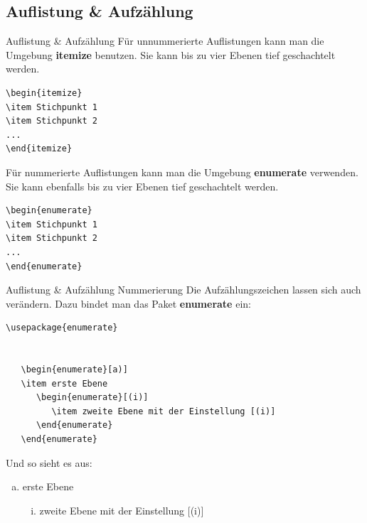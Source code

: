 \subsection{Auflistung \& Aufzählung}
\begin{frame}[fragile]{Auflistung \& Aufzählung}
Für unnummerierte Auflistungen kann man die Umgebung \textbf{itemize} benutzen. Sie kann bis zu vier Ebenen tief geschachtelt werden.
\begin{lstlisting}[style=tex]
\begin{itemize}
\item Stichpunkt 1
\item Stichpunkt 2
...
\end{itemize}
\end{lstlisting}%
Für nummerierte Auflistungen kann man die Umgebung \textbf{enumerate} verwenden. Sie kann ebenfalls bis zu vier Ebenen tief geschachtelt werden.
\begin{lstlisting}[style=tex]
\begin{enumerate}
\item Stichpunkt 1
\item Stichpunkt 2
...
\end{enumerate}
\end{lstlisting}
\end{frame}

\begin{frame}[fragile]{Auflistung \& Aufzählung Nummerierung}
Die Aufzählungszeichen lassen sich auch verändern.
Dazu bindet man das Paket \textbf{enumerate} ein:
\begin{lstlisting}[style=tex]
\usepackage{enumerate}


   \begin{enumerate}[a)]
   \item erste Ebene
      \begin{enumerate}[(i)]
         \item zweite Ebene mit der Einstellung [(i)]
      \end{enumerate}
   \end{enumerate}

\end{lstlisting}%

\bigskip
Und so sieht es aus:
\begin{enumerate}[a)]
\item erste Ebene
\begin{enumerate}[(i)]
\item zweite Ebene mit der Einstellung [(i)]
\end{enumerate}
\end{enumerate}
\end{frame}

